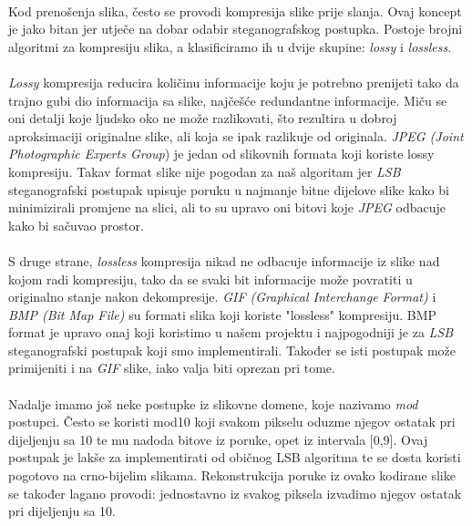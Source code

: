 \documentclass[times, utf8, seminar, numeric]{fer}
\begin{document}
\paragraph{}
Kod prenošenja slika, često se provodi kompresija slike prije slanja. Ovaj koncept je jako bitan jer utječe na dobar odabir steganografskog postupka. Postoje brojni algoritmi za kompresiju slika, a klasificiramo ih u dvije skupine: \textit{lossy} i \textit{lossless}.
\paragraph{}
\textit{Lossy} kompresija reducira količinu informacije koju je potrebno prenijeti tako da trajno gubi dio informacija sa slike, najčešće redundantne informacije. Miču se oni detalji koje ljudsko oko ne može razlikovati, što rezultira u dobroj aproksimaciji originalne slike, ali koja se ipak razlikuje od originala. \textit{JPEG (Joint Photographic Experts Group}) je jedan od slikovnih formata koji koriste lossy kompresiju. Takav format slike nije pogodan za naš algoritam jer \textit{LSB} steganografski postupak upisuje poruku u najmanje bitne dijelove slike kako bi minimizirali promjene na slici, ali to su upravo oni bitovi koje \textit{JPEG} odbacuje kako bi sačuvao prostor.
\paragraph{}
S druge strane, \textit{lossless} kompresija nikad ne odbacuje informacije iz slike nad kojom radi kompresiju, tako da se svaki bit informacije može povratiti u originalno stanje nakon dekompresije. \textit{GIF (Graphical Interchange Format)} i \textit{BMP (Bit Map File)} su formati slika koji koriste "lossless" kompresiju. BMP format je upravo onaj koji koristimo u našem projektu i najpogodniji je za \textit{LSB} steganografski postupak koji smo implementirali. Također se isti postupak može primijeniti i na \textit{GIF} slike, iako valja biti oprezan pri tome.

\paragraph{}
Nadalje imamo još neke postupke iz slikovne domene, koje nazivamo \textit{mod} postupci. Često se koristi mod10 koji svakom pikselu oduzme njegov ostatak pri dijeljenju sa 10 te mu nadoda bitove iz poruke, opet iz intervala [0,9]. Ovaj postupak je lakše za implementirati od običnog LSB algoritma te se dosta koristi pogotovo na crno-bijelim slikama. Rekonstrukcija poruke iz ovako kodirane slike se također lagano provodi: jednostavno iz svakog piksela izvadimo njegov ostatak pri dijeljenju sa 10.
\end{document}
